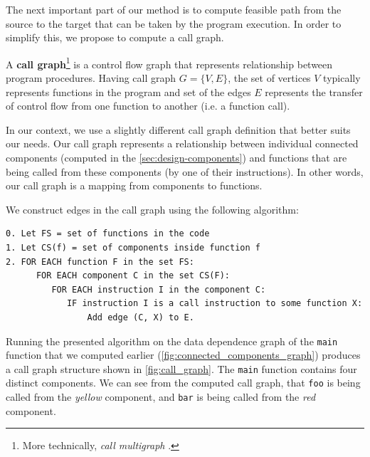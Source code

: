 \documentclass[12pt, twoside]{fithesis2}
\renewcommand{\_}{\leavevmode \kern0.07em\vbox{\hrule width0.4em}}
\begin{document}
The next important part of our method is to compute feasible path from the source
to the target that can be taken by the program execution.
In order to simplify this, we propose to compute a call graph.

A \textbf{call graph}\footnote{
More technically, \emph{call multigraph} \cite{data_flow}.}
is a control flow graph that represents relationship
between program procedures\cite{data_flow}.
Having call graph $G = \{V, E\}$, the set of vertices $V$ typically represents
functions in the program and set of the edges $E$ represents the transfer of
control flow from one function to another (i.e. a function call).

In our context, we use a slightly different call graph definition that better
suits our needs.
Our call graph represents a relationship between individual
connected components (computed in the \autoref{sec:design-components})
and functions that are being called from these components (by one of their
instructions).
In other words, our call graph is a mapping from components to
functions.

We construct edges in the call graph using the following algorithm:

\begin{verbatim}
0. Let FS = set of functions in the code
1. Let CS(f) = set of components inside function f
2. FOR EACH function F in the set FS:
      FOR EACH component C in the set CS(F):
         FOR EACH instruction I in the component C:
            IF instruction I is a call instruction to some function X:
                Add edge (C, X) to E.
\end{verbatim}

Running the presented algorithm on the data dependence graph
of the \texttt{main} function that we computed earlier
(\autoref{fig:connected_components_graph}) produces a call graph structure
shown in \autoref{fig:call_graph}.
The \texttt{main} function contains four distinct components.
We can see from the computed call graph, that \texttt{foo} is being
called from the \emph{yellow} component, and \texttt{bar} is being
called from the \emph{red} component.
\end{document}
